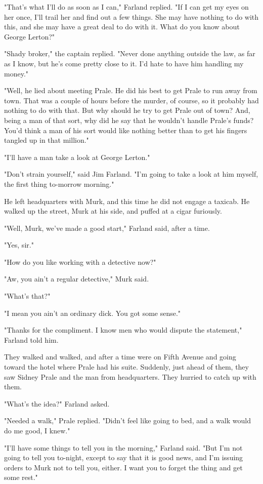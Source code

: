 \documentclass{novel}
\begin{document}
"That's what I'll do as soon as I can," Farland replied. "If I can get my eyes on her once, I'll trail her and find out a few things. She may have nothing to do with this, and she may have a great deal to do with it. What do you know about George Lerton?"

"Shady broker," the captain replied. "Never done anything outside the law, as far as I know, but he's come pretty close to it. I'd hate to have him handling my money."

"Well, he lied about meeting Prale. He did his best to get Prale to run away from town. That was a couple of hours before the murder, of course, so it probably had nothing to do with that. But why should he try to get Prale out of town? And, being a man of that sort, why did he say that he wouldn't handle Prale's funds? You'd think a man of his sort would like nothing better than to get his fingers tangled up in that million."

"I'll have a man take a look at George Lerton."

"Don't strain yourself," said Jim Farland. "I'm going to take a look at him myself, the first thing to-morrow morning."

He left headquarters with Murk, and this time he did not engage a taxicab. He walked up the street, Murk at his side, and puffed at a cigar furiously.

"Well, Murk, we've made a good start," Farland said, after a time.

"Yes, sir."

"How do you like working with a detective now?"

"Aw, you ain't a regular detective," Murk said.

"What's that?"

"I mean you ain't an ordinary dick. You got some sense."

"Thanks for the compliment. I know men who would dispute the statement," Farland told him.

They walked and walked, and after a time were on Fifth Avenue and going toward the hotel where Prale had his suite. Suddenly, just ahead of them, they saw Sidney Prale and the man from headquarters. They hurried to catch up with them.

"What's the idea?" Farland asked.

"Needed a walk," Prale replied. "Didn't feel like going to bed, and a walk would do me good, I knew."

"I'll have some things to tell you in the morning," Farland said. "But I'm not going to tell you to-night, except to say that it is good news, and I'm issuing orders to Murk not to tell you, either. I want you to forget the thing and get some rest."
\end{document}
